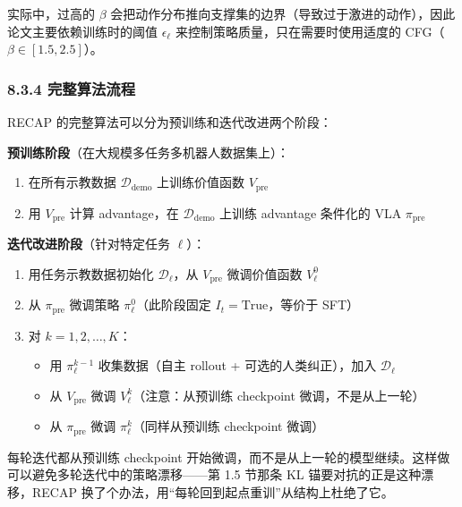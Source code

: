 \documentclass[
  chinese,
]{ctexart}
\providecommand{\tightlist}{%
  \setlength{\itemsep}{0pt}\setlength{\parskip}{0pt}}
\begin{document}
实际中，过高的 \(\beta\)
会把动作分布推向支撑集的边界（导致过于激进的动作），因此论文主要依赖训练时的阈值
\(\epsilon_\ell\) 来控制策略质量，只在需要时使用适度的
CFG（\(\beta \in [1.5, 2.5]\)）。

\subsubsection{8.3.4
完整算法流程}\label{ux5b8cux6574ux7b97ux6cd5ux6d41ux7a0b}

RECAP 的完整算法可以分为预训练和迭代改进两个阶段：

\textbf{预训练阶段}（在大规模多任务多机器人数据集上）：

\begin{enumerate}
\def\labelenumi{\arabic{enumi}.}
\tightlist
\item
  在所有示教数据 \(\mathcal{D}_\text{demo}\) 上训练价值函数
  \(V_\text{pre}\)
\item
  用 \(V_\text{pre}\) 计算 advantage，在 \(\mathcal{D}_\text{demo}\)
  上训练 advantage 条件化的 VLA \(\pi_\text{pre}\)
\end{enumerate}

\textbf{迭代改进阶段}（针对特定任务 \(\ell\)）：

\begin{enumerate}
\def\labelenumi{\arabic{enumi}.}
\setcounter{enumi}{2}
\tightlist
\item
  用任务示教数据初始化 \(\mathcal{D}_\ell\)，从 \(V_\text{pre}\)
  微调价值函数 \(V^0_\ell\)
\item
  从 \(\pi_\text{pre}\) 微调策略 \(\pi^0_\ell\)（此阶段固定
  \(I_t = \text{True}\)，等价于 SFT）
\item
  对 \(k = 1, 2, \ldots, K\)：

  \begin{itemize}
  \tightlist
  \item
    用 \(\pi^{k-1}_\ell\) 收集数据（自主 rollout +
    可选的人类纠正），加入 \(\mathcal{D}_\ell\)
  \item
    从 \(V_\text{pre}\) 微调 \(V^k_\ell\)（注意：从预训练 checkpoint
    微调，不是从上一轮）
  \item
    从 \(\pi_\text{pre}\) 微调 \(\pi^k_\ell\)（同样从预训练 checkpoint
    微调）
  \end{itemize}
\end{enumerate}

每轮迭代都从预训练 checkpoint
开始微调，而不是从上一轮的模型继续。这样做可以避免多轮迭代中的策略漂移------第
1.5 节那条 KL 锚要对抗的正是这种漂移，RECAP
换了个办法，用``每轮回到起点重训''从结构上杜绝了它。
\end{document}
